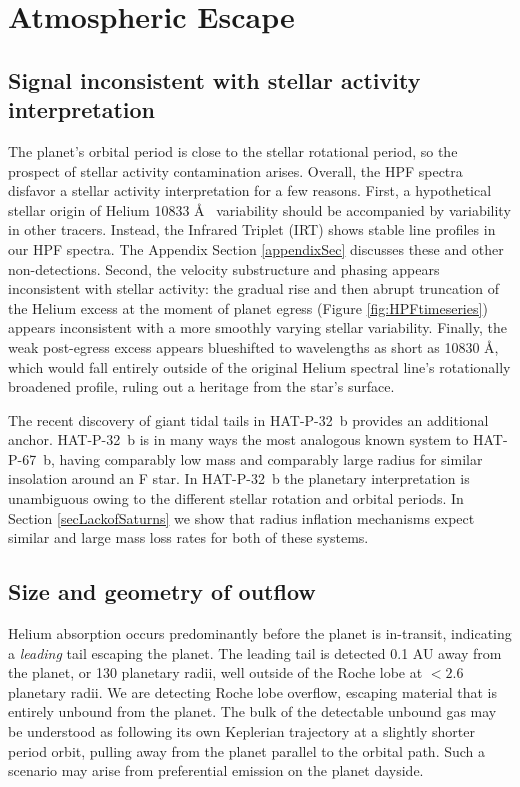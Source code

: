 \documentclass[twocolumn]{aastex631}
\begin{document}
\section{Atmospheric Escape}\label{secResults}

\subsection{Signal inconsistent with stellar activity interpretation}
The planet's orbital period is close to the stellar rotational period, so the prospect of stellar activity contamination arises.  Overall, the HPF spectra disfavor a stellar activity interpretation for a few reasons.  First, a hypothetical stellar origin of Helium 10833 \AA~ variability should be accompanied by variability in other tracers.  Instead, the  Infrared Triplet (IRT) shows stable line profiles in our HPF spectra.  The Appendix Section \ref{appendixSec} discusses these and other non-detections.  Second, the velocity substructure and phasing appears inconsistent with stellar activity: the gradual rise and then abrupt truncation of the Helium excess at the moment of planet egress (Figure \ref{fig:HPFtimeseries}) appears inconsistent with a more smoothly varying stellar variability.  Finally, the weak post-egress excess appears blueshifted to wavelengths as short as 10830 \AA, which would fall entirely outside of the original Helium spectral line's rotationally broadened profile, ruling out a heritage from the star's surface.  

The recent discovery of giant tidal tails in HAT-P-32~b \citep{doi:10.1126/sciadv.adf8736} provides an additional anchor.  HAT-P-32~b is in many ways the most analogous known system to HAT-P-67~b, having comparably low mass and comparably large radius for similar insolation around an F star.  In HAT-P-32~b the planetary interpretation is unambiguous owing to the different stellar rotation and orbital periods.  In Section \ref{secLackofSaturns} we show that radius inflation mechanisms expect similar and large mass loss rates for both of these systems.  


\subsection{Size and geometry of outflow}
Helium absorption occurs predominantly before the planet is in-transit, indicating a \emph{leading} tail escaping the planet.  The leading tail is detected 0.1 AU away from the planet, or 130 planetary radii, well outside of the Roche lobe at $<2.6$ planetary radii.  We are detecting Roche lobe overflow, escaping material that is entirely unbound from the planet.  The bulk of the detectable unbound gas may be understood as following its own Keplerian trajectory at a slightly shorter period orbit, pulling away from the planet parallel to the orbital path.  Such a scenario may arise from preferential emission on the planet dayside.
\end{document}
